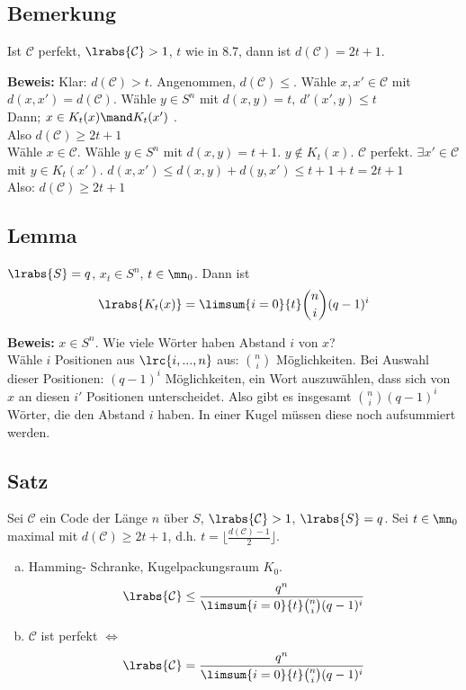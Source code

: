 	\subsection{Bemerkung}
		Ist $ \mathcal{C} $ perfekt, $ \lrabs{\mathcal{C}}>1 $, $ t $ wie in 8.7, dann ist $ d(\mathcal{C})=2t+1 $.
		
		\textbf{Beweis:} Klar: $ d(\mathcal{C})>t $. Angenommen, $ d(\mathcal{C})\leq $. Wähle $ x,x'\in\mathcal{C} $ mit $ d(x,x')=d(\mathcal{C}) $. Wähle $ y\in S^n $ mit $ d(x,y)=t,\ d'(x',y)\leq t $\\
		Dann; $ x\in K_t(x)\mand K_t(x') $ \lightning.\\
		Also $ d(\mathcal{C})\geq 2t+1 $\\
		Wähle $ x\in\mathcal{C} $. Wähle $ y\in S^n $ mit $ d(x,y)=t+1 $. $ y\notin K_t(x) $. $ \mathcal{C} $ perfekt. $ \exists x'\in\mathcal{C} $ mit $ y\in K_t(x') $. $ d(x,x')\leq d(x,y)+d(y,x') \leq t+1+t=2t+1 $\\
		Also: $ d(\mathcal{C})\geq 2t+1 $
		
	\subsection{Lemma}
		$ \lrabs{S}=q $, $ x_t\in S^n $, $ t\in\mn_0 $. Dann ist
		\[\lrabs{K_t(x)}=\limsum{i=0}{t}\binom{n}{i}(q-1)^i\]
		
		\textbf{Beweis:} $ x\in S^n $. Wie viele Wörter haben Abstand $ i $ von $ x $?\\
		Wähle $ i $ Positionen aus $ \lrc{i,...,n} $ aus: $ \binom{n}{i} $ Möglichkeiten.
		Bei Auswahl dieser Positionen: $ (q-1)^i $ Möglichkeiten, ein Wort auszuwählen, dass sich von $ x $ an diesen $ i' $ Positionen unterscheidet. Also gibt es insgesamt $ \binom{n}{i}(q-1)^i $ Wörter, die den Abstand $ i $ haben. In einer Kugel müssen diese noch aufsummiert werden.
		
	\subsection{Satz}
		Sei $ \mathcal{C} $ ein Code der Länge $ n $ über $ S $, $ \lrabs{\mathcal{C}}>1 $, $ \lrabs{S}=q $. Sei $ t\in\mn_0 $ maximal mit $ d(\mathcal{C})\geq 2t+1 $, d.h. $ t=\lfloor\frac{d(\mathcal{C}) -1}{2}\rfloor $.
		\begin{enumerate}[a)]
			\item  Hamming- Schranke, Kugelpackungsraum $ K_0 $.
			\[\lrabs{\mathcal{C}}\leq\dfrac{q^n}{\limsum{i=0}{t}\binom{n}{i}(q-1)^i}\]
			\item  $ \mathcal{C} $ ist perfekt $ \Leftrightarrow $ \[\lrabs{\mathcal{C}}=\dfrac{q^n}{\limsum{i=0}{t}\binom{n}{i}(q-1)^i}\]
		\end{enumerate}
		
